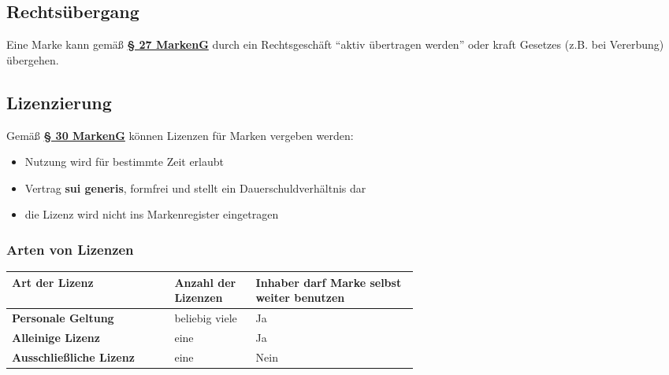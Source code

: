 \documentclass[12pt,A4]{extarticle}
\newcommand{\markenG}[2][]{\textbf{\textcolor{markenGesetzLink}{\href{https://www.gesetze-im-internet.de/markeng/__#2.html}{§ #2 \ifthenelse{\equal{#1}{}}{}{#1 }MarkenG}}}}
\begin{document}
\subsection{Rechtsübergang}
Eine Marke kann gemäß \markenG{27} durch ein Rechtsgeschäft ``aktiv übertragen werden'' oder kraft Gesetzes (z.B. bei Vererbung) übergehen.

\subsection{Lizenzierung}
Gemäß \markenG{30} können Lizenzen für Marken vergeben werden:
\begin{itemize}
  \item{Nutzung wird für bestimmte Zeit erlaubt}
  \item{Vertrag \textbf{sui generis}, formfrei und stellt ein Dauerschuldverhältnis dar}
  \item{die Lizenz wird nicht ins Markenregister eingetragen}
\end{itemize}

\subsubsection{Arten von Lizenzen}
\bgroup
\def\arraystretch{1.5}
\begin{table}[h]
  \begin{tabular}{|l|p{0.2\linewidth}|p{0.4\linewidth}|}
    \hline
    Art der Lizenz                  & Anzahl der Lizenzen & Inhaber darf Marke selbst weiter benutzen \\ \hline
    \textbf{Personale Geltung}      & beliebig viele      & Ja                                        \\ \hline
    \textbf{Alleinige Lizenz}       & eine                & Ja                                        \\ \hline
    \textbf{Ausschließliche Lizenz} & eine                & Nein                                      \\ \hline
  \end{tabular}
\end{table}
\end{document}
